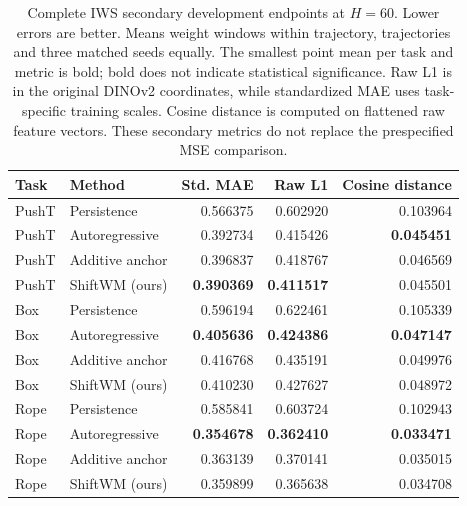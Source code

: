 \begin{table}[!htb]\centering
\caption{Complete IWS secondary development endpoints at $H=60$. Lower errors are better. Means weight windows within trajectory, trajectories and three matched seeds equally. The smallest point mean per task and metric is bold; bold does not indicate statistical significance. Raw L1 is in the original DINOv2 coordinates, while standardized MAE uses task-specific training scales. Cosine distance is computed on flattened raw feature vectors. These secondary metrics do not replace the prespecified MSE comparison.}
\label{tab:iws-secondary}
\begingroup\small\setlength{\tabcolsep}{4pt}
\begin{tabular}{@{}llrrr@{}}\toprule Task & Method & Std. MAE & Raw L1 & Cosine distance \\ \midrule
PushT & Persistence & 0.566375 & 0.602920 & 0.103964 \\
PushT & Autoregressive & 0.392734 & 0.415426 & \textbf{0.045451} \\
PushT & Additive anchor & 0.396837 & 0.418767 & 0.046569 \\
PushT & ShiftWM (ours) & \textbf{0.390369} & \textbf{0.411517} & 0.045501 \\
Box & Persistence & 0.596194 & 0.622461 & 0.105339 \\
Box & Autoregressive & \textbf{0.405636} & \textbf{0.424386} & \textbf{0.047147} \\
Box & Additive anchor & 0.416768 & 0.435191 & 0.049976 \\
Box & ShiftWM (ours) & 0.410230 & 0.427627 & 0.048972 \\
Rope & Persistence & 0.585841 & 0.603724 & 0.102943 \\
Rope & Autoregressive & \textbf{0.354678} & \textbf{0.362410} & \textbf{0.033471} \\
Rope & Additive anchor & 0.363139 & 0.370141 & 0.035015 \\
Rope & ShiftWM (ours) & 0.359899 & 0.365638 & 0.034708 \\
\bottomrule\end{tabular}\endgroup\end{table}
